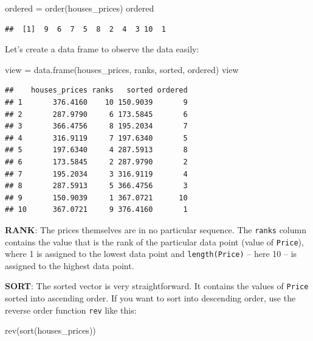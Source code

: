\documentclass[
]{book}
\newenvironment{Shaded}{\begin{snugshade}}{\end{snugshade}}
\newcommand{\FunctionTok}[1]{\textcolor[rgb]{0.00,0.00,0.00}{#1}}
\newcommand{\NormalTok}[1]{#1}
\newcommand{\OtherTok}[1]{\textcolor[rgb]{0.56,0.35,0.01}{#1}}
\theoremstyle{definition}
\theoremstyle{definition}
\theoremstyle{definition}
\theoremstyle{definition}
\theoremstyle{remark}
\begin{document}
\begin{Shaded}
\begin{Highlighting}[]
\NormalTok{ordered }\OtherTok{=} \FunctionTok{order}\NormalTok{(houses\_prices)}
\NormalTok{ordered}
\end{Highlighting}
\end{Shaded}

\begin{verbatim}
##  [1]  9  6  7  5  8  2  4  3 10  1
\end{verbatim}

Let's create a data frame to observe the data easily:

\begin{Shaded}
\begin{Highlighting}[]
\NormalTok{view }\OtherTok{=} \FunctionTok{data.frame}\NormalTok{(houses\_prices, ranks, sorted, ordered)}
\NormalTok{view}
\end{Highlighting}
\end{Shaded}

\begin{verbatim}
##    houses_prices ranks   sorted ordered
## 1       376.4160    10 150.9039       9
## 2       287.9790     6 173.5845       6
## 3       366.4756     8 195.2034       7
## 4       316.9119     7 197.6340       5
## 5       197.6340     4 287.5913       8
## 6       173.5845     2 287.9790       2
## 7       195.2034     3 316.9119       4
## 8       287.5913     5 366.4756       3
## 9       150.9039     1 367.0721      10
## 10      367.0721     9 376.4160       1
\end{verbatim}

\textbf{RANK}: The prices themselves are in no particular sequence. The \texttt{ranks} column contains the value that is the rank of the particular data point (value of \texttt{Price}), where 1 is assigned to the lowest data point and \texttt{length(Price)} -- here 10 -- is assigned to the highest data point.

\textbf{SORT}: The sorted vector is very straightforward. It contains the values of \texttt{Price} sorted into ascending order. If you want to sort into descending order, use the reverse order function \texttt{rev} like this:

\begin{Shaded}
\begin{Highlighting}[]
\FunctionTok{rev}\NormalTok{(}\FunctionTok{sort}\NormalTok{(houses\_prices))}
\end{Highlighting}
\end{Shaded}
\end{document}

